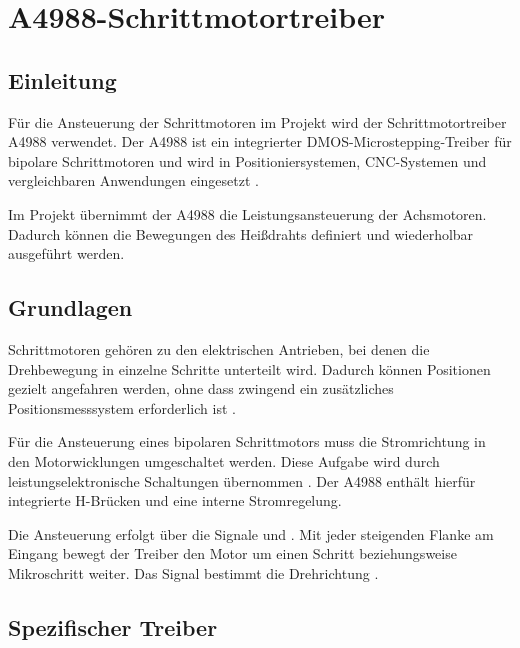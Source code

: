 %
%

\chapter{A4988-Schrittmotortreiber}

\section{Einleitung}

Für die Ansteuerung der Schrittmotoren im Projekt wird der Schrittmotortreiber A4988 verwendet. 
Der A4988 ist ein integrierter DMOS-Microstepping-Treiber für bipolare Schrittmotoren und wird in Positioniersystemen, CNC-Systemen und vergleichbaren Anwendungen eingesetzt \cite{Allegro:A4988}.

Im Projekt übernimmt der A4988 die Leistungsansteuerung der Achsmotoren. 
Dadurch können die Bewegungen des Heißdrahts definiert und wiederholbar ausgeführt werden.

\section{Grundlagen}

Schrittmotoren gehören zu den elektrischen Antrieben, bei denen die Drehbewegung in einzelne Schritte unterteilt wird. 
Dadurch können Positionen gezielt angefahren werden, ohne dass zwingend ein zusätzliches Positionsmesssystem erforderlich ist \cite{Isermann:2008}.

Für die Ansteuerung eines bipolaren Schrittmotors muss die Stromrichtung in den Motorwicklungen umgeschaltet werden. 
Diese Aufgabe wird durch leistungselektronische Schaltungen übernommen \cite{Zach:2022}. 
Der A4988 enthält hierfür integrierte H-Brücken und eine interne Stromregelung.

Die Ansteuerung erfolgt über die Signale  und . 
Mit jeder steigenden Flanke am Eingang  bewegt der Treiber den Motor um einen Schritt beziehungsweise Mikroschritt weiter. 
Das Signal  bestimmt die Drehrichtung \cite{Allegro:A4988}.

\section{Spezifischer Treiber}

